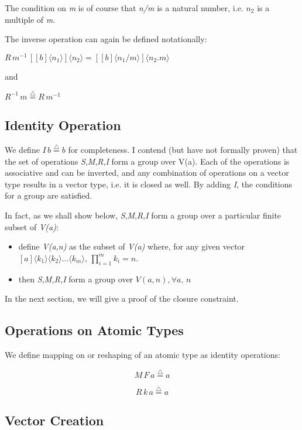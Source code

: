 \documentclass{article}
\begin{document}
The condition on \emph{m} is of course that \emph{n/m} is a natural
number, i.e. $n_{2}$ is a multiple of \emph{m}.

The inverse operation can again be defined notationally:

$R\, m^{-1}\,[[b]\langle n_{1}\rangle]\langle n_{2}\rangle=[[b]\langle n_{1}/m\rangle]\langle n_{2}.m\rangle$

and

$R^{-1}\, m\overset{{\scriptscriptstyle \triangle}}{=}R\, m^{-1}$


\subsection{Identity Operation}

We define $I\, b\overset{{\scriptscriptstyle \triangle}}{=}b$ for
completeness. I contend (but have not formally proven) that the set
of operations \emph{S},\emph{M},\emph{R},\emph{I} form a group over
V(a). Each of the operations is associative and can be inverted, and
any combination of operations on a vector type results in a vector
type, i.e. it is closed as well. By adding \emph{I}, the conditions
for a group are satisfied.

In fact, as we shall show below, \emph{S},\emph{M},\emph{R},\emph{I}
form a group over a particular finite subset of \emph{V(a)}: 
\begin{itemize}
\item define \emph{V(a,n)} as the subset of \emph{V(a)} where, for any given
vector $[a]\langle k_{1}\rangle\langle k_{2}\rangle...\langle k_{m}\rangle$,
$\prod_{i=1}^{m}k_{i}=n$.
\item then \emph{S,M,R,I} form a group over $V(a,n),\forall a,\, n$
\end{itemize}
In the next section, we will give a proof of the closure constraint.


\subsection{Operations on Atomic Types}

We define mapping on or reshaping of an atomic type as identity operations:

\[
M\, F\, a\overset{{\scriptscriptstyle \triangle}}{=}a
\]


\[
R\, k\, a\overset{{\scriptscriptstyle \triangle}}{=}a
\]



\subsection{Vector Creation}
\end{document}
